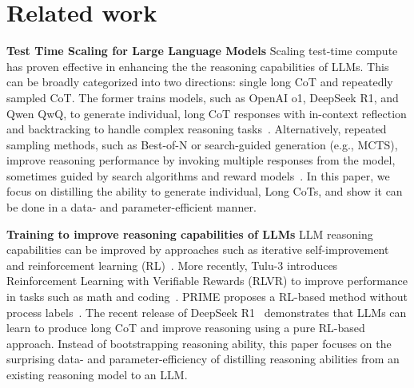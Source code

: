 \section{Related work}
\textbf{Test Time Scaling for Large Language Models}
Scaling test-time compute has proven effective in enhancing the the reasoning capabilities of LLMs. 
This can be broadly categorized into two directions: single long CoT and repeatedly sampled CoT. The former trains models, such as OpenAI o1, DeepSeek R1, and Qwen QwQ, to generate individual, long CoT responses with in-context reflection and backtracking to handle complex reasoning tasks~\citep{guo2025deepseek, jaech2024openai, team2024qwq}. 
Alternatively, repeated sampling methods, such as Best-of-N or search-guided generation (e.g., MCTS), improve reasoning performance by invoking multiple responses from the model, sometimes guided by search algorithms and reward models~\citep{snell2024scaling, brown2024large}. In this paper, we focus on distilling the ability to generate individual, Long CoTs, and show it can be done in a data- and parameter-efficient manner. 

\textbf{Training to improve reasoning capabilities of LLMs}
LLM reasoning capabilities can be improved by approaches such as iterative self-improvement and reinforcement learning (RL)~\citep{zelikman2022star, lightman2023let, lambert2024t, yuan2024free, guo2025deepseek}. More recently, Tulu-3 introduces Reinforcement Learning with Verifiable Rewards (RLVR) to improve performance in tasks such as math and coding~\citep{hendrycksmath2021,jain2024livecodebench,numina_math_datasets}. PRIME proposes a RL-based method without process labels~\citep{yuan2024free}. The recent release of DeepSeek R1~\cite{guo2025deepseek} demonstrates that LLMs can learn to produce long CoT and improve reasoning using a pure RL-based approach. 
Instead of bootstrapping reasoning ability, this paper focuses on the surprising data- and parameter-efficiency of distilling reasoning abilities from an existing reasoning model to an LLM. 


